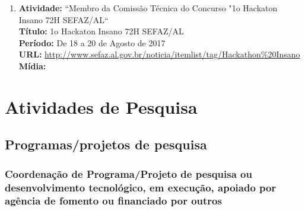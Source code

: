 \documentclass[a4paper,oneside,10pt]{article}
\begin{document}
\begin{enumerate}
\newpage
 \item   \textbf{Atividade:} ``Membro da Comissão Técnica do Concurso "1o Hackaton Insano 72H SEFAZ/AL`` 
  \mbox{} \\
        \textbf{Título:} 1o Hackaton Insano 72H SEFAZ/AL\\
        \textbf{Período:} De 18 a 20 de Agosto de 2017 \\
        \textbf{URL:} \url{http://www.sefaz.al.gov.br/noticia/itemlist/tag/Hackathon%20Insano}\\
        \textbf{Mídia:}   
  \end{enumerate}         
        

\newpage
\section{Atividades de Pesquisa}

\subsection{Programas/projetos de pesquisa}

\subsubsection{Coordenação de Programa/Projeto de pesquisa ou desenvolvimento tecnológico, em execução, apoiado por agência de fomento ou financiado por outros}
\vspace{0.3cm}
\end{document}
